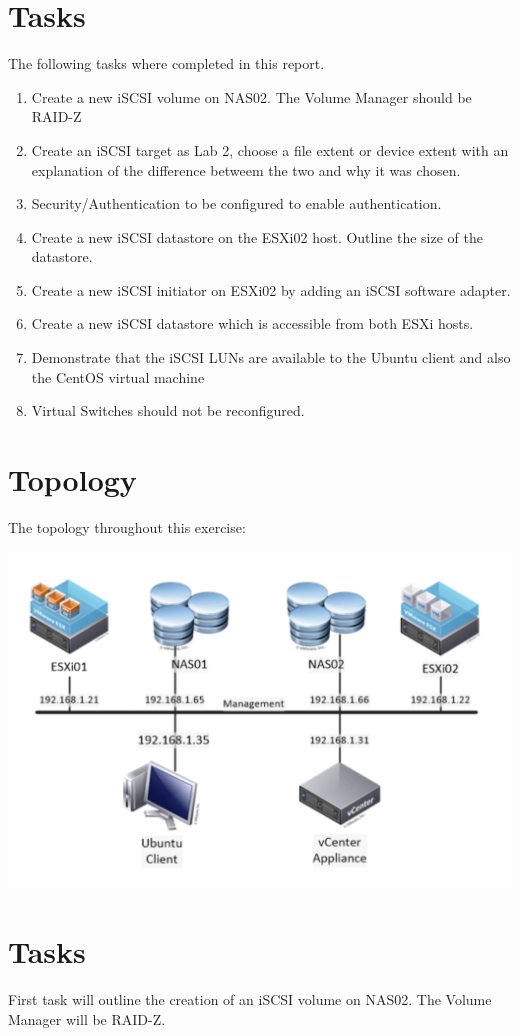 \section{Tasks}
The following tasks where completed in this report.
\begin{enumerate}
    \item Create a new iSCSI volume on NAS02. The Volume Manager should be RAID-Z
    \item Create an iSCSI target as Lab 2, choose a file extent or device extent with an explanation of the difference betweem the two and why it was chosen.
    \item Security/Authentication to be configured to enable authentication.
    \item Create a new iSCSI datastore on the ESXi02 host. Outline the size of the datastore.
    \item Create a new iSCSI initiator on ESXi02 by adding an iSCSI software adapter.
    \item Create a new iSCSI datastore which is accessible from both ESXi hosts.
    \item Demonstrate that the iSCSI LUNs are available to the Ubuntu client and also the CentOS virtual machine
    \item Virtual Switches should not be reconfigured.
\end{enumerate}

\section{Topology}
The topology throughout this exercise:

\includegraphics[width=\textwidth]{topology.png}
\section{Tasks}
First task will outline the creation of an iSCSI volume on NAS02. The Volume Manager will be RAID-Z.

